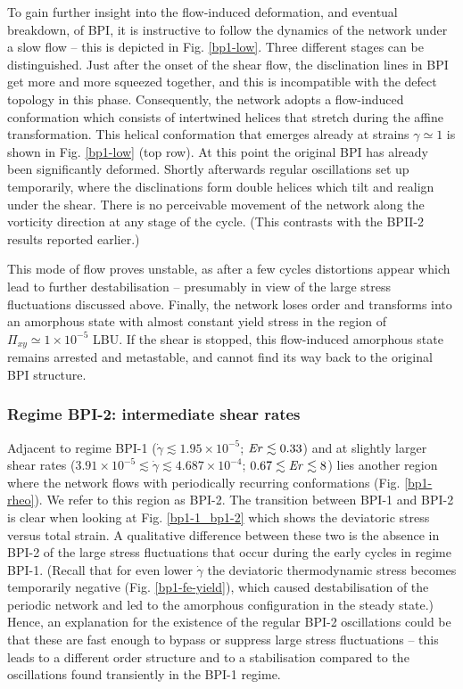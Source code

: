 \documentclass[aps,pre,reprint,superscriptaddress, twocolumn]{revtex4}
\newcommand{\e}[1]{\times10^{#1}}
\newcommand{\gd}{\dot{\gamma}}
\begin{document}
To gain further insight into the flow-induced deformation, and eventual
breakdown, of BPI, it is instructive to follow the dynamics of 
the network under a slow flow -- this is depicted in Fig. \ref{bp1-low}.
Three different stages can be distinguished. 
Just after the onset of the shear flow, the disclination lines 
in BPI get more and more squeezed together, and this is incompatible with
the defect topology in this phase.
Consequently, the network adopts a flow-induced conformation which consists 
of intertwined helices that stretch during the affine transformation.
This helical conformation that emerges already at strains $\gamma\simeq1$ 
is shown in Fig. \ref{bp1-low} (top row).
At this point the original BPI has already been significantly deformed.
Shortly afterwards regular oscillations set up temporarily,
where the disclinations form double helices which tilt and realign under the shear.
There is no perceivable movement of the 
network along the vorticity direction at any stage of the cycle.
(This contrasts with the BPII-2 results reported earlier.)

This mode of flow proves unstable, as after a few cycles 
distortions appear which lead to further destabilisation -- presumably in
view of the large stress fluctuations discussed above. 
Finally, the network loses order and 
transforms into an amorphous state with almost constant
yield stress in the region of $\Pi_{xy}\simeq 1\e{-5}$ LBU.
If the shear is stopped, this flow-induced amorphous state
remains arrested and metastable, and cannot
find its way back to the original BPI structure.

\subsubsection{Regime BPI-2: intermediate shear rates}

Adjacent to regime BPI-1 ($\gd\lesssim1.95\e{-5}$; $ {\it Er}\lesssim 0.33$) and 
at slightly larger shear rates ($3.91\e{-5}\lesssim\gd\lesssim 4.687\e{-4}$; $0.67\lesssim{\it Er}\lesssim8$)
lies another region where the network flows with periodically 
recurring conformations (Fig. \ref{bp1-rheo}). 
We refer to this region as BPI-2. The transition between BPI-1 and BPI-2 
is clear when looking at Fig. \ref{bp1-1_bp1-2} 
which shows the deviatoric stress versus total strain. 
A qualitative difference between these two is the absence in BPI-2 of the 
large stress fluctuations that occur during the early cycles in regime BPI-1.
(Recall that for even lower $\gd$ the deviatoric thermodynamic stress becomes 
temporarily negative (Fig. \ref{bp1-fe-yield}), which 
caused destabilisation of the periodic network and led to the 
amorphous configuration in the steady state.)
Hence, an explanation
for the existence of the regular BPI-2 oscillations 
could be that these are fast enough to bypass or suppress 
large stress fluctuations -- this leads to
a different order structure and to a stabilisation 
compared to the oscillations found transiently in
the BPI-1 regime.
\end{document}
